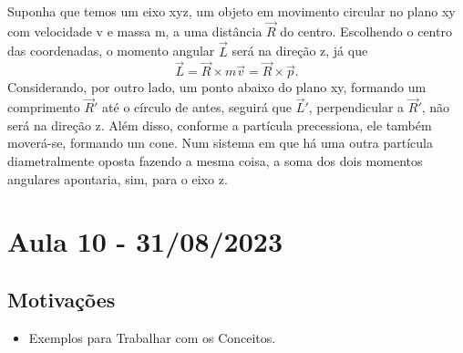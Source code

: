 \documentclass{article}
\begin{document}
Suponha que temos um eixo xyz, um objeto em movimento circular no plano xy com velocidade v e massa m, a uma distância \(\vec{R}\) do centro.
Escolhendo o centro das coordenadas, o momento angular \(\vec{L}\) será na direção z, já que 
\[
  \vec{L} = \vec{R}\times m \vec{v} = \vec{R}\times \vec{p}.
\]
Considerando, por outro lado, um ponto abaixo do plano xy, formando um comprimento \(\vec{R}'\) até o círculo de antes, seguirá que \(\vec{L}'\), perpendicular a 
\(\vec{R}'\), não será na direção z. Além disso, conforme a partícula precessiona, ele também moverá-se, formando um cone. Num sistema em que há uma outra partícula diametralmente
oposta fazendo a mesma coisa, a soma dos dois momentos angulares apontaria, sim, para o eixo z.
\newpage

\section{Aula 10 - 31/08/2023}
\subsection{Motivações}
\begin{itemize}
  \item Exemplos para Trabalhar com os Conceitos.
\end{itemize}
\end{document}
